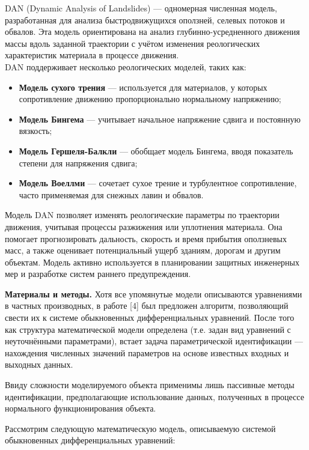 \begin{multicols}{2}
DAN (Dynamic Analysis of Landslides) --- одномерная численная модель,
разработанная для анализа быстродвижущихся оползней, селевых потоков и
обвалов. Эта модель ориентирована на анализ глубинно-усредненного
движения массы вдоль заданной траектории с учётом изменения
реологических характеристик материала в процессе движения.\\
DAN поддерживает несколько реологических моделей, таких как:

\begin{itemize}
\item
  {\bfseries Модель сухого трения} --- используется для материалов, у
  которых сопротивление движению пропорционально нормальному напряжению;
\item
  {\bfseries Модель Бингема} --- учитывает начальное напряжение сдвига и
  постоянную вязкость;
\item
  {\bfseries Модель Гершеля-Балкли} --- обобщает модель Бингема, вводя
  показатель степени для напряжения сдвига;
\item
  {\bfseries Модель Воеллми} --- сочетает сухое трение и турбулентное
  сопротивление, часто применяемая для снежных лавин и обвалов.
\end{itemize}

Модель DAN позволяет изменять реологические параметры по траектории
движения, учитывая процессы разжижения или уплотнения материала. Она
помогает прогнозировать дальность, скорость и время прибытия оползневых
масс, а также оценивает потенциальный ущерб зданиям, дорогам и другим
объектам. Модель активно используется в планировании защитных инженерных
мер и разработке систем раннего предупреждения.

{\bfseries Материалы и методы.} Хотя все упомянутые модели описываются
уравнениями в частных производных, в работе {[}4{]} был предложен
алгоритм, позволяющий свести их к системе обыкновенных дифференциальных
уравнений. После того как структура математической модели определена
(т.е. задан вид уравнений с неуточнёнными параметрами), встает задача
параметрической идентификации --- нахождения численных значений
параметров на основе известных входных и выходных данных.

Ввиду сложности моделируемого объекта применимы лишь пассивные методы
идентификации, предполагающие использование данных, полученных в
процессе нормального функционирования объекта.

Рассмотрим следующую математическую модель, описываемую системой
обыкновенных дифференциальных уравнений:


\end{multicols}
